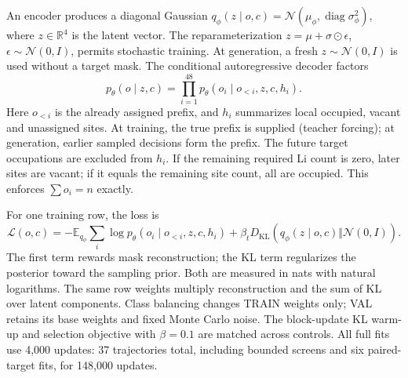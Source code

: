 \documentclass[10pt]{article}
\begin{document}
An encoder produces a diagonal Gaussian
$q_\phi(z\mid o,c)=\mathcal N(\mu_\phi,\operatorname{diag}\sigma_\phi^2)$,
where $z\in\mathbb R^4$ is the latent vector. The reparameterization
$z=\mu+\sigma\odot\epsilon$, $\epsilon\sim\mathcal N(0,I)$, permits stochastic
training. At generation, a fresh $z\sim\mathcal N(0,I)$ is used without a target
mask. The conditional autoregressive decoder factors
\begin{equation}
 p_\theta(o\mid z,c)=\prod_{i=1}^{48}
 p_\theta(o_i\mid o_{<i},z,c,h_i).
\end{equation}
Here $o_{<i}$ is the already assigned prefix, and $h_i$ summarizes local
occupied, vacant and unassigned sites. At training, the true prefix is supplied
(teacher forcing); at generation, earlier sampled decisions form the prefix.
The future target occupations are excluded from $h_i$. If the remaining required
Li count is zero, later sites are vacant; if it equals the remaining site count,
all are occupied. This enforces $\sum o_i=n$ exactly.

For one training row, the loss is
\begin{equation}
 \mathcal L(o,c)=-\mathbb E_{q_\phi}\sum_i\log p_\theta(o_i\mid o_{<i},z,c,h_i)
 +\beta_t D_{\mathrm{KL}}\!\left(q_\phi(z\mid o,c)\Vert\mathcal N(0,I)\right).
\end{equation}
The first term rewards mask reconstruction; the KL term regularizes the
posterior toward the sampling prior. Both are measured in nats with natural
logarithms. The same row weights multiply reconstruction and the sum of KL over
latent components. Class balancing changes TRAIN weights only; VAL retains its
base weights and fixed Monte Carlo noise. The block-update KL warm-up
and selection objective with $\beta=0.1$ are matched across controls. All full
fits use 4,000 updates: 37 trajectories total, including bounded screens and six
paired-target fits, for 148,000 updates.
\end{document}

